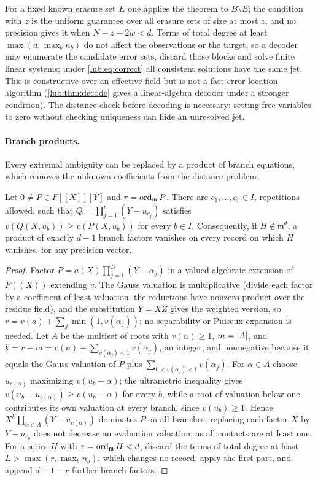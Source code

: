 For a fixed known erasure set $E$ one applies the theorem to $B\setminus E$; the condition
with $z$ is the uniform guarantee over all erasure sets of size at most $z$, and no
precision gives it when $N-z-2w<d$. Terms of total degree at least $\max(d,\max_bn_b)$ do not affect
the observations or the target, so a decoder may enumerate the candidate error sets, discard those
blocks and solve finite linear systems; under \eqref{lub:eq:correct} all consistent solutions have the
same jet. This is constructive over an effective field but is not a fast error-location algorithm
(\cref{lub:thm:decode} gives a linear-algebra decoder under a stronger condition). The distance check
before decoding is necessary: setting free variables to zero without checking uniqueness can hide an
unresolved jet.

\paragraph{Branch products.}
Every extremal ambiguity can be replaced by a product of branch equations, which removes the unknown
coefficients from the distance problem.

\begin{lemma}\label{lub:lem:domination}
Let $0\ne P\in F[[X]][Y]$ and $r=\operatorname{ord}_{\mathfrak m}P$. There are $c_1,\dots,c_r\in I$, repetitions
allowed, such that $Q=\prod_{j=1}^r(Y-u_{c_j})$ satisfies $v(Q(X,u_b))\ge v(P(X,u_b))$ for every $b\in I$.
Consequently, if $H\notin\mathfrak m^d$, a product of exactly $d-1$ branch factors vanishes on every
record on which $H$ vanishes, for any precision vector.
\end{lemma}

\begin{proof}
Factor $P=a(X)\prod_{j=1}^D(Y-\alpha_j)$ in a valued algebraic extension of $F((X))$ extending $v$. The
Gauss valuation is multiplicative (divide each factor by a coefficient of least valuation; the
reductions have nonzero product over the residue field), and the substitution $Y=XZ$ gives the
weighted version, so $r=v(a)+\sum_j\min(1,v(\alpha_j))$; no separability or Puiseux expansion is
needed. Let $A$ be the multiset of roots with $v(\alpha)\ge1$, $m=\lvert A\rvert$, and $k=r-m=v(a)+
\sum_{v(\alpha_j)<1}v(\alpha_j)$, an integer, and nonnegative because it equals the Gauss valuation of
$P$ plus $\sum_{0<v(\alpha_j)<1}v(\alpha_j)$. For $\alpha\in A$ choose $u_{c(\alpha)}$ maximizing
$v(u_b-\alpha)$; the ultrametric inequality gives $v(u_b-u_{c(\alpha)})\ge v(u_b-\alpha)$ for every $b$,
while a root of valuation below one contributes its own valuation at every branch, since
$v(u_b)\ge1$. Hence $X^k\prod_{\alpha\in A}(Y-u_{c(\alpha)})$ dominates $P$ on all branches; replacing each
factor $X$ by $Y-u_{c_0}$ does not decrease an evaluation valuation, as all contacts are at least one.
For a series $H$ with $r=\operatorname{ord}_{\mathfrak m}H<d$, discard the terms of total degree at least
$L>\max(r,\max_bn_b)$, which changes no record, apply the first part, and append $d-1-r$ further branch
factors.
\end{proof}

